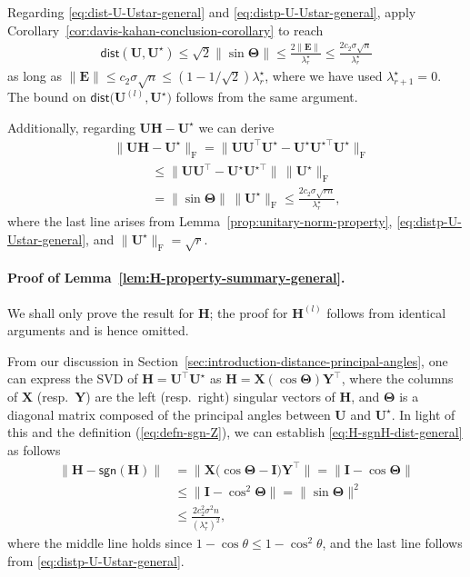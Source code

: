 Regarding \eqref{eq:dist-U-Ustar-general} and \eqref{eq:distp-U-Ustar-general},
apply Corollary~\ref{cor:davis-kahan-conclusion-corollary} to reach
\begin{align}
\mathsf{dist}(\bm{U},\bm{U}^{\star})\leq\sqrt{2}\|\sin\bm{\Theta}\|\leq\frac{2\|\bm{E}\|}{\lambda_{r}^{\star}}\leq\frac{2c_{2}\sigma\sqrt{n}}{\lambda_{r}^{\star}}\label{eq:dist-UUstar-sin-Theta-general-UB123}
\end{align}
as long as $\|\bm{E}\|\leq c_{2}\sigma\sqrt{n}\leq(1-1/\sqrt{2})\lambda_{r}^{\star}$,
where we have used $\lambda_{r+1}^{\star}=0$. The bound on $\mathsf{dist}\big(\bm{U}^{(l)},\bm{U}^{\star}\big)$
follows from the same argument.

Additionally, regarding $\bm{U}\bm{H}-\bm{U}^{\star}$ we can derive
%
\begin{align}
 & \|\bm{U}\bm{H}-\bm{U}^{\star}\|_{\mathrm{F}}=\|\bm{U}\bm{U}^{\top}\bm{U}^{\star}-\bm{U}^{\star}\bm{U}^{\star\top}\bm{U}^{\star}\|_{\mathrm{F}}\nonumber \\
 & \qquad\quad\leq\|\bm{U}\bm{U}^{\top}-\bm{U}^{\star}\bm{U}^{\star\top}\|\,\|\bm{U}^{\star}\|_{\mathrm{F}} \nonumber\\
 &\qquad\quad=\|\sin\bm{\Theta}\|\,\|\bm{U}^{\star}\|_{\mathrm{F}}\leq\frac{2c_{2}\sigma\sqrt{rn}}{\lambda_{r}^{\star}},
\end{align}
where the last line arises from Lemma~\ref{prop:unitary-norm-property},
\eqref{eq:distp-U-Ustar-general}, and $\|\bm{U}^{\star}\|_{\mathrm{F}}=\sqrt{r}$.




\paragraph{Proof of Lemma~\ref{lem:H-property-summary-general}.}

We shall only prove the result for $\bm{H}$; the proof for $\bm{H}^{(l)}$
follows from identical arguments and is hence omitted.

From our discussion in Section~\ref{sec:introduction-distance-principal-angles},
one can express the SVD of $\bm{H}=\bm{U}^{\top}\bm{U}^{\star}$ as
$\bm{H}=\bm{X}(\cos\bm{\Theta})\bm{Y}^{\top}$, where the columns
of $\bm{X}$ (resp.~$\bm{Y}$) are the left (resp.~right) singular
vectors of $\bm{H}$, and $\bm{\Theta}$ is a diagonal matrix composed
of the principal angles between $\bm{U}$ and $\bm{U}^{\star}$. In
light of this and the definition (\ref{eq:defn-sgn-Z}), we can establish
\eqref{eq:H-sgnH-dist-general} as follows
%
\begin{align}
\big\|\bm{H}-\mathsf{sgn}(\bm{H})\big\| & =\big\|\bm{X}\big(\cos\bm{\Theta}-\bm{I}\big)\bm{Y}^{\top}\big\|=\big\|\bm{I}-\cos\bm{\Theta}\big\|\nonumber \\
 & \leq \big\|\bm{I}-\cos^{2}\bm{\Theta}\big\| = \|\sin\bm{\Theta}\|^{2}\nonumber \\
 & \leq\frac{2c_{2}^{2}\sigma^{2}n}{(\lambda_{r}^{\star})^{2}},
	\label{eq:H-sgnH-diff-UB-123}
\end{align}
%
where the middle line holds since $1-\cos\theta \leq 1 - \cos^2 \theta$,
and the last line follows from \eqref{eq:distp-U-Ustar-general}.

